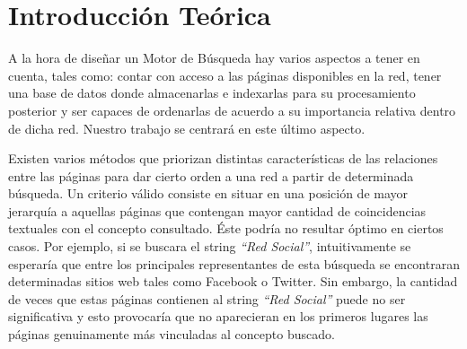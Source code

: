\documentclass[a4paper]{article}
\begin{document}
\thispagestyle{empty}

\maketitle
\newpage

\thispagestyle{empty}
\vfill
\begin{abstract}
\textcolor{blue}{El resumen de no m\'as de 200 palabras, deber\'a explicar brevemente el trabajo realizado y las conclusiones de los autores de manera que pueda ser \'util por s\'i solo para dar una idea del contenido del trabajo.} \\
\\
\\
\indent \indent \textbf{Palabras claves} \\
\\
$\circ$ Matriz Esparsa \\
$\circ$ PageRank \\
$\circ$ HITS \\
$\circ$ In-deg \\

\end{abstract}

\thispagestyle{empty}
\vspace{3cm}
\tableofcontents
\newpage


\newpage

\section{Introducci\'on Te\'orica}

A la hora de dise\~nar un Motor de B\'usqueda hay varios aspectos a tener en cuenta, tales como: contar con acceso a las p\'aginas disponibles en la red, tener una base de datos donde almacenarlas e indexarlas para su procesamiento posterior y ser capaces de ordenarlas de acuerdo a su importancia relativa dentro de dicha red. Nuestro trabajo se centrar\'a en este \'ultimo aspecto.

Existen varios m\'etodos que priorizan distintas caracter\'isticas de las relaciones entre las p\'aginas para dar cierto orden a una red a partir de determinada b\'usqueda. Un criterio v\'alido consiste en situar en una posici\'on de mayor jerarqu\'ia a aquellas p\'aginas que contengan mayor cantidad de coincidencias textuales con el concepto consultado. \'Este podr\'ia no resultar \'optimo en ciertos casos. Por ejemplo, si se buscara el string \textit{``Red Social''}, intuitivamente se esperar\'ia que entre los principales representantes de esta b\'usqueda se encontraran determinadas sitios web tales como Facebook o Twitter. Sin embargo, la cantidad de veces que estas p\'aginas contienen al string \textit{``Red Social''} puede no ser significativa y esto provocar\'ia que no aparecieran en los primeros lugares las p\'aginas genuinamente m\'as vinculadas al concepto buscado.
\end{document}
